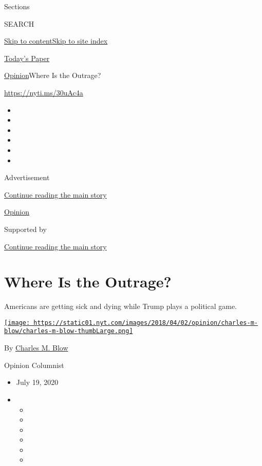 Sections

SEARCH

\protect\hyperlink{site-content}{Skip to
content}\protect\hyperlink{site-index}{Skip to site index}

\href{https://myaccount.nytimes.com/auth/login?response_type=cookie\&client_id=vi}{}

\href{https://www.nytimes.com/section/todayspaper}{Today's Paper}

\href{/section/opinion}{Opinion}\textbar{}Where Is the Outrage?

\url{https://nyti.ms/30uAc4a}

\begin{itemize}
\item
\item
\item
\item
\item
\item
\end{itemize}

Advertisement

\protect\hyperlink{after-top}{Continue reading the main story}

\href{/section/opinion}{Opinion}

Supported by

\protect\hyperlink{after-sponsor}{Continue reading the main story}

\hypertarget{where-is-the-outrage}{%
\section{Where Is the Outrage?}\label{where-is-the-outrage}}

Americans are getting sick and dying while Trump plays a political game.

\href{https://www.nytimes.com/by/charles-m-blow}{\texttt{[image: https://static01.nyt.com/images/2018/04/02/opinion/charles-m-blow/charles-m-blow-thumbLarge.png]}}

By \href{https://www.nytimes.com/by/charles-m-blow}{Charles M. Blow}

Opinion Columnist

\begin{itemize}
\item
  July 19, 2020
\item
  \begin{itemize}
  \item
  \item
  \item
  \item
  \item
  \item
  \end{itemize}
\end{itemize}

